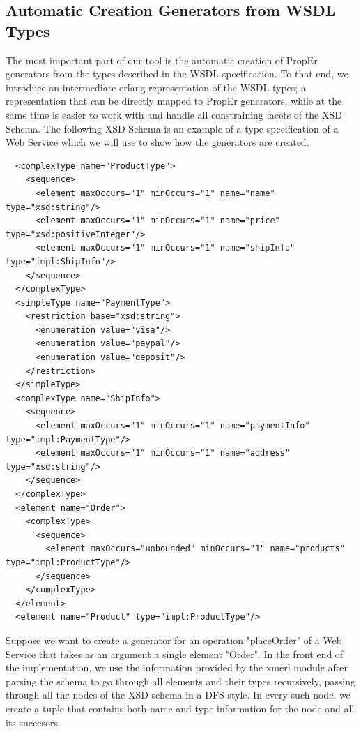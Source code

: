 \documentclass[submission,copyright,a4]{eptcs}
\begin{document}
\subsection{Automatic Creation Generators from WSDL Types}

The most important part of our tool is the automatic creation of PropEr generators from the types described in the WSDL specification. To that end, we introduce an intermediate erlang representation of the WSDL types; a representation that can be directly mapped to PropEr generators, while at the same time is easier to work with and handle all constraining facets of the XSD Schema. The following XSD Schema is an example of a type specification of a Web Service which we will use to show how the generators are created.

\begin{lstlisting}
  <complexType name="ProductType">
    <sequence>
      <element maxOccurs="1" minOccurs="1" name="name" type="xsd:string"/>
      <element maxOccurs="1" minOccurs="1" name="price" type="xsd:positiveInteger"/>
      <element maxOccurs="1" minOccurs="1" name="shipInfo" type="impl:ShipInfo"/>
    </sequence>
  </complexType>
  <simpleType name="PaymentType">
    <restriction base="xsd:string">
      <enumeration value="visa"/>
      <enumeration value="paypal"/>
      <enumeration value="deposit"/>
    </restriction>
  </simpleType>
  <complexType name="ShipInfo">
    <sequence>
      <element maxOccurs="1" minOccurs="1" name="paymentInfo" type="impl:PaymentType"/>
      <element maxOccurs="1" minOccurs="1" name="address" type="xsd:string"/>
    </sequence>
  </complexType>
  <element name="Order">
    <complexType>
      <sequence>
        <element maxOccurs="unbounded" minOccurs="1" name="products" type="impl:ProductType"/>
      </sequence>
    </complexType>
  </element>
  <element name="Product" type="impl:ProductType"/>
\end{lstlisting}


Suppose we want to create a generator for an operation "placeOrder" of a Web Service that takes as an argument a single element "Order". In the front end of the implementation, we use the information provided by the xmerl module after parsing the schema to go through all elements and their types recursively, passing through all the nodes of the XSD schema in a DFS style. In every such node, we create a tuple that contains both name and type information for the node and all its succesors. 
\end{document}
